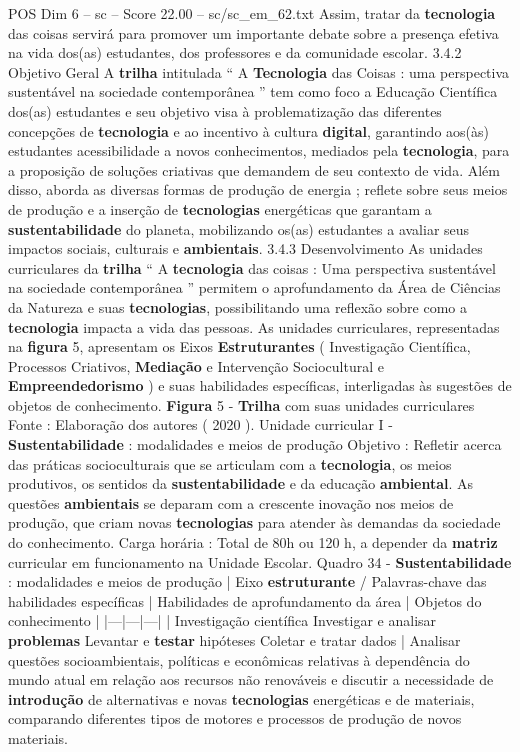 \begin{textsample}{POS Dim 6 – sc – Score 22.00 – sc/sc\_em\_62.txt}
Assim, tratar da \textbf{tecnologia} das coisas servirá para promover um importante debate sobre a presença efetiva na vida dos(as) estudantes, dos professores e da comunidade escolar. 3.4.2 Objetivo Geral A \textbf{trilha} intitulada “ A \textbf{Tecnologia} das Coisas : uma perspectiva sustentável na sociedade contemporânea ” tem como foco a Educação Científica dos(as) estudantes e seu objetivo visa à problematização das diferentes concepções de \textbf{tecnologia} e ao incentivo à cultura \textbf{digital}, garantindo aos(às) estudantes acessibilidade a novos conhecimentos, mediados pela \textbf{tecnologia}, para a proposição de soluções criativas que demandem de seu contexto de vida.
Além disso, aborda as diversas formas de produção de energia ; reflete sobre seus meios de produção e a inserção de \textbf{tecnologias} energéticas que garantam a \textbf{sustentabilidade} do planeta, mobilizando os(as) estudantes a avaliar seus impactos sociais, culturais e \textbf{ambientais}. 3.4.3 Desenvolvimento As unidades curriculares da \textbf{trilha} “ A \textbf{tecnologia} das coisas : Uma perspectiva sustentável na sociedade contemporânea ” permitem o aprofundamento da Área de Ciências da Natureza e suas \textbf{tecnologias}, possibilitando uma reflexão sobre como a \textbf{tecnologia} impacta a vida das pessoas.
As unidades curriculares, representadas na \textbf{figura} 5, apresentam os Eixos \textbf{Estruturantes} ( Investigação Científica, Processos Criativos, \textbf{Mediação} e Intervenção Sociocultural e \textbf{Empreendedorismo} ) e suas habilidades específicas, interligadas às sugestões de objetos de conhecimento. \textbf{Figura} 5 - \textbf{Trilha} com suas unidades curriculares Fonte : Elaboração dos autores ( 2020 ).
Unidade curricular I - \textbf{Sustentabilidade} : modalidades e meios de produção Objetivo : Refletir acerca das práticas socioculturais que se articulam com a \textbf{tecnologia}, os meios produtivos, os sentidos da \textbf{sustentabilidade} e da educação \textbf{ambiental}.
As questões \textbf{ambientais} se deparam com a crescente inovação nos meios de produção, que criam novas \textbf{tecnologias} para atender às demandas da sociedade do conhecimento.
Carga horária : Total de 80h ou 120 h, a depender da \textbf{matriz} curricular em funcionamento na Unidade Escolar.
Quadro 34 - \textbf{Sustentabilidade} : modalidades e meios de produção | Eixo \textbf{estruturante} / Palavras-chave das habilidades específicas | Habilidades de aprofundamento da área | Objetos do conhecimento | |---|---|---| | Investigação científica Investigar e analisar \textbf{problemas} Levantar e \textbf{testar} hipóteses Coletar e tratar dados | Analisar questões socioambientais, políticas e econômicas relativas à dependência do mundo atual em relação aos recursos não renováveis e discutir a necessidade de \textbf{introdução} de alternativas e novas \textbf{tecnologias} energéticas e de materiais, comparando diferentes tipos de motores e processos de produção de novos materiais.

\end{textsample}
